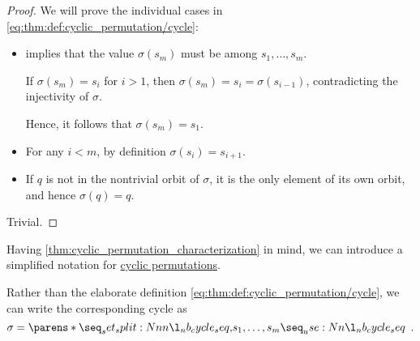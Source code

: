 \begin{proof}
   We will prove the individual cases in \eqref{eq:thm:def:cyclic_permutation/cycle}:
  \begin{itemize}
    \item {} implies that the value \( \sigma(s_m) \) must be among \( s_1, \ldots, s_m \).

    If \( \sigma(s_m) = s_i \) for \( i > 1 \), then \( \sigma(s_m) = s_i = \sigma(s_{i-1}) \), contradicting the injectivity of \( \sigma \).

    Hence, it follows that \( \sigma(s_m) = s_1 \).

    \item For any \( i < m \), by definition \( \sigma(s_i) = s_{i + 1} \).

    \item If \( q \) is not in the nontrivial orbit of \( \sigma \), it is the only element of its own orbit, and hence \( \sigma(q) = q \).
  \end{itemize}

   Trivial.
\end{proof}

\begin{remark}\label{rem:cycle_notation}
  Having \cref{thm:cyclic_permutation_characterization} in mind, we can introduce a simplified notation for \hyperref[def:cyclic_permutation]{cyclic permutations}.

  Rather than the elaborate definition \eqref{eq:thm:def:cyclic_permutation/cycle}, we can write the corresponding cycle as
  \begin{equation*}
    \sigma = \cycle{ s_1, \ldots, s_m }.
  \end{equation*}
\end{remark}

